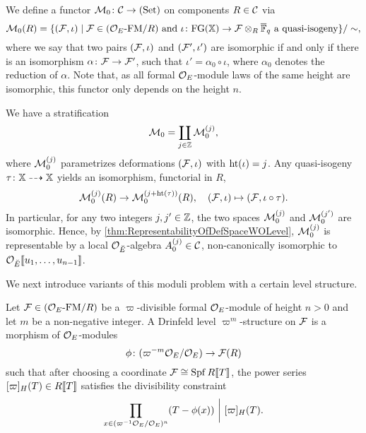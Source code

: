 \documentclass[../main.tex]{subfiles}
\begin{document}
We define a functor $\mathcal{M}_0\colon \mathcal{C} \to {(\mathrm{Set})}$ on components $R \in \mathcal{C}$ via
\begin{equation*}
  \mathcal{M}_0(R) = \{(\mathcal{F}, \iota) \mid \mathcal{F} \in {({\mathcal{O}_E}\text-\allowbreak\mathrm{FM}/{R})} \text { and }
  \iota\colon \textnormal{FG}(\mathbb{X}) \to \mathcal{F} \otimes_R {\overline {\mathbb{F}}_q} \text{ a quasi-isogeny}\}/\sim,
\end{equation*}
where we say that two pairs $(\mathcal{F}, \iota)$ and $(\mathcal{F}', \iota')$ are isomorphic
if and only if there is an isomorphism $\alpha \colon \mathcal{F} \to \mathcal{F}'$,
such that $\iota' = \alpha_0 \circ \iota$, where $\alpha_0$ denotes the reduction
of $\alpha$. Note that, as all formal $\mathcal{O}_E$-module laws of the same height
are isomorphic, this functor only depends on the height $n$.

We have a stratification
\begin{equation*}
  \mathcal{M}_0 = \coprod_{j \in \mathbb{Z}} \mathcal{M}_0^{(j)},
\end{equation*}
where $\mathcal{M}_0^{(j)}$ parametrizes deformations $(\mathcal{F}, \iota)$ with $\textnormal{ht}(\iota) = j$.
Any quasi-isogeny $\tau\colon \mathbb{X} \dashrightarrow \mathbb{X}$ yields an isomorphism, 
functorial in $R$,
\begin{equation*}
  \mathcal{M}_0^{(j)}(R) \to \mathcal{M}_0^{(j + \textnormal{ht}(\tau))}(R), \quad
  (\mathcal{F}, \iota) \mapsto (\mathcal{F}, \iota \circ \tau). 
\end{equation*}
In particular, for any two integers $j, j' \in \mathbb{Z}$, the two spaces
$\mathcal{M}_0^{(j)}$ and $\mathcal{M}_0^{(j')}$ are isomorphic. Hence, by
\cref{thm:RepresentabilityOfDefSpaceWOLevel}, $\mathcal{M}_0^{(j)}$ is representable by 
a local $\mathcal{O}_{\breve {E}}$-algebra $A^{(j)}_0 \in \mathcal{C}$, non-canonically isomorphic 
to $\mathcal{O}_{\breve {E}} \llbracket u_1, \dots, u_{n-1} \rrbracket$.

We next introduce variants of this moduli problem with a certain level structure.

\begin{defi}
  Let $\mathcal{F} \in {({\mathcal{O}_E}\text-\allowbreak\mathrm{FM}/{R})}$ be a $\varpi$-divisible formal $\mathcal{O}_E$-module
  of height $n>0$ and let $m$ be a non-negative 
  integer. A Drinfeld level $\varpi^m$-structure on $\mathcal{F}$ is a morphism of
  $\mathcal{O}_E$-modules 
  \begin{equation*}
    \phi\colon {(\varpi^{-m}\mathcal{O}_E/\mathcal{O}_E)} \to \mathcal{F}(R)
  \end{equation*}
  such that after choosing a coordinate $\mathcal{F} \cong \operatorname{Spf} R\llbracket T \rrbracket$, the 
  power series $[\varpi]_H(T) \in R\llbracket T \rrbracket$ satisfies the divisibility
  constraint
  \begin{equation*}
    \prod_{x \in (\varpi^{-1}\mathcal{O}_E/\mathcal{O}_E)^n}(T - \phi(x)) \ \bigg\vert \ [\varpi]_H(T).
  \end{equation*}
\end{defi}
\end{document}
